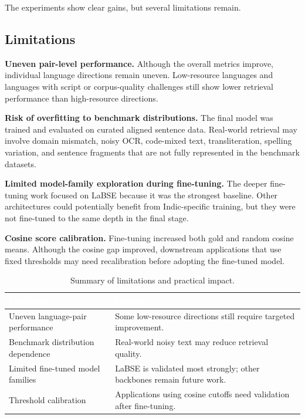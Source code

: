 \documentclass[12pt, a4paper]{article}
\begin{document}
The experiments show clear gains, but several limitations remain.

\subsection{Limitations}

\textbf{Uneven pair-level performance.}
Although the overall metrics improve, individual language directions remain uneven. Low-resource languages and languages with script or corpus-quality challenges still show lower retrieval performance than high-resource directions.

\textbf{Risk of overfitting to benchmark distributions.}
The final model was trained and evaluated on curated aligned sentence data. Real-world retrieval may involve domain mismatch, noisy OCR, code-mixed text, transliteration, spelling variation, and sentence fragments that are not fully represented in the benchmark datasets.

\textbf{Limited model-family exploration during fine-tuning.}
The deeper fine-tuning work focused on LaBSE because it was the strongest baseline. Other architectures could potentially benefit from Indic-specific training, but they were not fine-tuned to the same depth in the final stage.

\textbf{Cosine score calibration.}
Fine-tuning increased both gold and random cosine means. Although the cosine gap improved, downstream applications that use fixed thresholds may need recalibration before adopting the fine-tuned model.

\begin{table}[H]
\centering
\footnotesize
\renewcommand{\arraystretch}{1.25}
\begin{tabular}{p{4.5cm} p{8.4cm}}
\toprule
\rowcolor{headerblue}
\textcolor{white}{\textbf{Limitation}} & \textcolor{white}{\textbf{Impact}} \\
\midrule
\rowcolor{rowgray}
Uneven language-pair performance & Some low-resource directions still require targeted improvement. \\
Benchmark distribution dependence & Real-world noisy text may reduce retrieval quality. \\
\rowcolor{rowgray}
Limited fine-tuned model families & LaBSE is validated most strongly; other backbones remain future work. \\
Threshold calibration & Applications using cosine cutoffs need validation after fine-tuning. \\
\bottomrule
\end{tabular}
\caption{Summary of limitations and practical impact.}
\label{tab:limitations}
\end{table}
\end{document}
